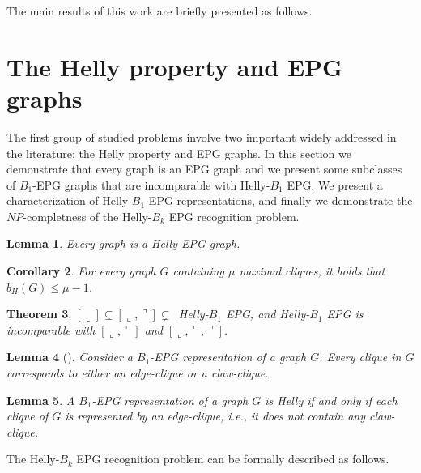 \documentclass[12pt]{article}
\newtheorem{theorem}{Theorem}
\newtheorem{lemma}[theorem]{Lemma}
\newtheorem{corollary}[theorem]{Corollary}
\begin{document}
The main results of this work are briefly presented as follows.

\section{The Helly property and EPG graphs}
The first group of studied problems involve two important widely addressed in the literature: the Helly property and EPG graphs. In this section we demonstrate that  every graph is an EPG graph and we present some subclasses of $B_1$-EPG graphs that are incomparable with Helly-$B_1$ EPG.  We present a characterization of Helly-$B_1$-EPG representations, and finally we demonstrate the $NP$-completness of the Helly-$B_k$ EPG recognition problem.

 \begin{lemma}\label{lem:todoGrafoEpgHelly}
 Every graph is a Helly-EPG graph.
 \end{lemma}
 
 \begin{corollary}\label{cor:maxCliques}
For every graph $G$ containing $\mu$ maximal cliques, it holds that $b_H(G)\leq \mu -1$. 
\end{corollary}

\begin{theorem}\label{theo:HellyLShaped}
$[\llcorner]\subsetneq [\llcorner, \urcorner]\subsetneq$~Helly-$B_1$ EPG, and Helly-$B_1$ EPG is incomparable with $[\llcorner, \ulcorner]$ and $[\llcorner, \ulcorner, \urcorner]$.
\end{theorem}

\begin{lemma}[\cite{golumbic2009}]\label{edge-claw-clique} 
Consider a $B_1$-EPG representation of a graph $G$. Every clique in $G$ corresponds to either an edge-clique or a claw-clique.
\end{lemma}

\begin{lemma}\label{caracterization}
A $B_1$-EPG representation of a graph $G$ is Helly if and only if each clique of $G$ is represented by an edge-clique, i.e., it does not contain any claw-clique.
\end{lemma}

The {\sc Helly-$B_k$ EPG recognition} problem can be formally described as follows.
\end{document}
